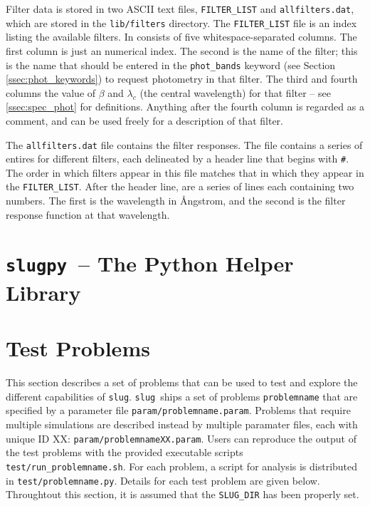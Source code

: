 \documentclass[12pt]{article}
\newcommand{\slug}{\texttt{slug}}
\newcommand{\slugpy}{\texttt{slugpy}}
\begin{document}
Filter data is stored in two ASCII text files, \verb=FILTER_LIST= and \verb=allfilters.dat=, which are stored in the \verb=lib/filters= directory. The \verb=FILTER_LIST= file is an index listing the available filters. In consists of five whitespace-separated columns. The first column is just an numerical index. The second is the name of the filter; this is the name that should be entered in the \verb=phot_bands= keyword (see Section \ref{ssec:phot_keywords}) to request photometry in that filter. The third and fourth columns the value of $\beta$ and $\lambda_c$ (the central wavelength) for that filter -- see \ref{ssec:spec_phot} for definitions. Anything after the fourth column is regarded as a comment, and can be used freely for a description of that filter.

The \verb=allfilters.dat= file contains the filter responses. The file contains a series of entires for different filters, each delineated by a header line that begins with \verb=#=. The order in which filters appear in this file matches that in which they appear in the \verb=FILTER_LIST=. After the header line, are a series of lines each containing two numbers. The first is the wavelength in {\AA}ngstrom, and the second is the filter response function at that wavelength.

\section{\slugpy\ -- The Python Helper Library}



\section{Test Problems}
\label{sec:test}

This section describes a set of problems that can be used to test and explore the different 
capabilities of \slug. \slug\ ships a set of problems \verb=problemname= that are specified by 
a parameter file \verb=param/problemname.param=. 
Problems that require multiple simulations are described instead by multiple 
paramater files, each with unique ID XX:  \verb=param/problemnameXX.param=.
Users can reproduce the output of the test problems with the provided executable scripts 
\verb=test/run_problemname.sh=. For each problem, a script for analysis is distributed 
in \verb=test/problemname.py=. Details for each test problem are given below. 
Throughtout this section, it is assumed that the \verb=SLUG_DIR= has been properly set. 
\end{document}
